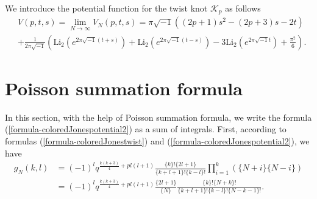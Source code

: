 \documentclass[12pt]{amsart}
\begin{document}
We introduce the potential function for the twist knot $\mathcal{K}_p$ as follows
\begin{align} \label{formula-potentialfunction00}
    &V(p,t,s)=\lim_{N\rightarrow\infty}V_{N}(p,t,s)=\pi \sqrt{-1}\left((2p+1)s^2-(2p+3)s-2t\right)\\\nonumber
    &+\frac{1}{2\pi\sqrt{-1}}\left(\text{Li}_2(e^{2\pi\sqrt{-1}(t+s)})+\text{Li}_2(e^{2\pi\sqrt{-1}(t-s)})-3\text{Li}_2(e^{2\pi\sqrt{-1}t})+\frac{\pi^2}{6}\right). 
\end{align}










\section{Poisson summation formula} \label{Section-poissonsummation}
In this section, with the help of Poisson summation formula, we write the formula (\ref{formula-coloredJonespotential2}) as a sum of integrals.  First, according to formulas (\ref{formula-coloredJonestwist}) and (\ref{formula-coloredJonespotential2}), we have
\begin{align}
g_{N}(k,l)&=(-1)^lq^{\frac{k(k+3)}{4}+pl(l+1)}\frac{\{k\}!\{2l+1\}}{\{k+l+1\}!\{k-l\}!}\prod_{i=1}^k(\{N+i\}
\{N-i\})\\\nonumber
&=(-1)^lq^{\frac{k(k+3)}{4}+pl(l+1)}\frac{\{2l+1\}}{\{N\}}\frac{\{k\}!\{N+k\}!}{\{k+l+1\}!\{k-l\}!\{N-k-1\}!}. 
\end{align}
\end{document}

